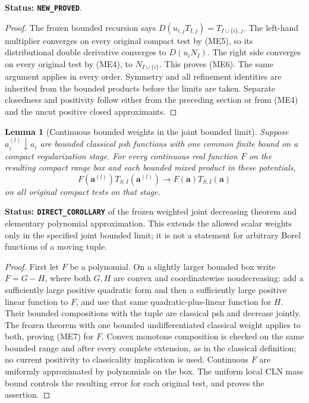 \documentclass[11pt,a4paper]{article}
\numberwithin{equation}{section}
\newtheorem{lemma}[theorem]{Lemma}
\theoremstyle{definition}
\theoremstyle{remark}
\begin{document}
\noindent\textbf{Status: \texttt{NEW\_PROVED}}.

\begin{proof}
The frozen bounded recursion says
$D(u_{i,j}T_{I,j})=T_{I\cup\{i\},j}$.
The left-hand multiplier converges on every original compact test
by (ME5), so its distributional double derivative converges to
$D(u_iN_I)$.  The right side converges on every original test by
(ME4), to $N_{I\cup\{i\}}$.  This proves (ME6).
The same argument applies in every order.  Symmetry and all
refinement identities are inherited from the bounded products before
the limits are taken.  Separate closedness and positivity follow
either from the preceding section or from (ME4) and the uncut
positive closed approximants.
\end{proof}

\begin{lemma}[Continuous bounded weights in the joint bounded limit]
\label{lem:r11-continuous-bounded-joint-weight}
Suppose $a_i^{(l)}\downarrow a_i$ are bounded classical psh functions
with one common finite bound on a compact regularization stage.
For every continuous real function $F$ on the resulting compact
range box and each bounded mixed product in these potentials,
\[
 F(\mathbf a^{(l)})T_{S,I}(\mathbf a^{(l)})
             \longrightarrow F(\mathbf a)T_{S,I}(\mathbf a)
 \tag{ME7}
\]
on all original compact tests on that stage.
\end{lemma}

\noindent\textbf{Status: \texttt{DIRECT\_COROLLARY}} of the
frozen weighted joint decreasing theorem and elementary polynomial
approximation.  This extends the allowed scalar weights only in the
specified joint bounded limit; it is not a statement for arbitrary
Borel functions of a moving tuple.

\begin{proof}
First let $F$ be a polynomial.  On a slightly larger bounded box
write $F=G-H$, where both $G,H$ are convex and coordinatewise
nondecreasing: add a sufficiently large positive quadratic form and
then a sufficiently large positive linear function to $F$, and use
that same quadratic-plus-linear function for $H$.  Their bounded
compositions with the tuple are classical psh and decrease jointly.
The frozen theorem with one bounded undifferentiated classical weight
applies to both, proving (ME7) for $F$.  Convex monotone composition
is checked on the same bounded range and after every complete
extension, as in the classical definition; no current positivity to
classicality implication is used.  Continuous $F$ are uniformly
approximated by polynomials on the box.  The uniform local CLN mass
bound controls the resulting error for each original test, and proves
the assertion.
\end{proof}
\end{document}
